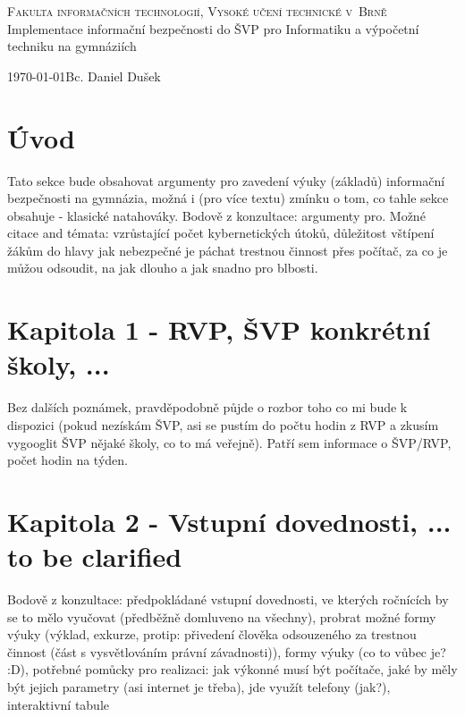 \documentclass[a4paper, 11pt]{article}
\title{\thesisname}
\author{Bc. Daniel Dušek}
\newcommand{\thesisname}{Implementace informační bezpečnosti do ŠVP pro Informatiku a výpočetní techniku na gymnáziích}
\begin{document}
\thispagestyle{empty}
\begin{center}
\Huge
\textsc{Fakulta informačních technologií, Vysoké učení technické v~Brně}\\
\LARGE
{}
\thesisname
{}
\end{center}
{\Large \today \hfill Bc. Daniel Dušek}





\newpage
\tableofcontents

\newpage
\setcounter{page}{1}
\section{Úvod}
Tato sekce bude obsahovat argumenty pro zavedení výuky (základů) informační bezpečnosti na gymnázia, možná i (pro více textu) zmínku o tom, co tahle sekce obsahuje - klasické natahováky.
Bodově z konzultace: argumenty pro. 
Možné citace and témata: vzrůstající počet kybernetických útoků, důležitost vštípení žákům do hlavy jak nebezpečné je páchat trestnou činnost přes počítač, za co je můžou odsoudit, na jak dlouho a jak snadno pro blbosti.

\section{Kapitola 1 - RVP, ŠVP konkrétní školy, ...}
Bez dalších poznámek, pravděpodobně půjde o rozbor toho co mi bude k dispozici (pokud nezískám ŠVP, asi se pustím do počtu hodin z RVP a zkusím vygooglit ŠVP nějaké školy, co to má veřejně). Patří sem informace o ŠVP/RVP, počet hodin na týden.

\section{Kapitola 2 - Vstupní dovednosti, ... to be clarified}
Bodově z konzultace: předpokládané vstupní dovednosti, ve kterých ročnících by se to mělo vyučovat (předběžně domluveno na všechny), probrat možné formy výuky (výklad, exkurze, protip: přivedení člověka odsouzeného za trestnou činnost (část s vysvětlováním právní závadnosti)), formy výuky (co to vůbec je? :D), potřebné pomůcky pro realizaci: jak výkonné musí být počítače, jaké by měly být jejich parametry (asi internet je třeba), jde využít telefony (jak?), interaktivní tabule
\end{document}
